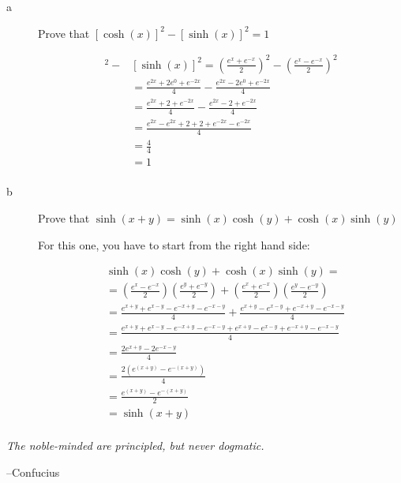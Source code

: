 \documentclass[fleqn,addpoints]{exam}
\begin{document}
\begin{description}
\item[a]
Prove that $[\cosh(x)]^2 - [\sinh(x)]^2 = 1$

\ifprintanswers
\begin{align*}
  [\cosh(x)]^2 - & [\sinh(x)]^2 = \left( \frac{e^x + e^{-x}}{2} \right)^2 - \left( \frac{e^x - e^{-x}}{2} \right)^2 \\
  &= \frac{e^{2x} + 2e^0 + e^{-2x}}{4} - \frac{e^{2x} - 2e^0 + e^{-2x}}{4} \\
  &= \frac{e^{2x} + 2 + e^{-2x}}{4} - \frac{e^{2x} - 2 + e^{-2x}}{4} \\
  &= \frac{e^{2x} - e^{2x} + 2 + 2 + e^{-2x} - e^{-2x}}{4} \\
  &= \frac{4}{4} \\
  &= 1 \\
\end{align*}
\fi

\item[b]
Prove that $\sinh(x+y) = \sinh(x)\cosh(y) + \cosh(x)\sinh(y)$

\ifprintanswers

For this one, you have to start from the right hand side:

\begin{align*}
  & \sinh(x)\cosh(y) + \cosh(x)\sinh(y) = \\
  &= \left( \frac{e^x - e^{-x}}{2} \right) \left( \frac{e^y + e^{-y}}{2} \right) 
      + \left( \frac{e^x + e^{-x}}{2} \right) \left( \frac{e^y - e^{-y}}{2} \right) \\
  &= \frac{e^{x+y} + e^{x-y} - e^{-x+y} - e^{-x-y}}{4} + \frac{e^{x+y} - e^{x-y} + e^{-x+y} - e^{-x-y}}{4} \\
  &= \frac{e^{x+y} + e^{x-y} - e^{-x+y} - e^{-x-y} + e^{x+y} - e^{x-y} + e^{-x+y} - e^{-x-y}}{4} \\
  &= \frac{2e^{x+y} - 2e^{-x-y}}{4} \\
  &= \frac{2(e^{(x+y)} - e^{-(x+y)})}{4} \\
  &= \frac{e^{(x+y)} - e^{-(x+y)}}{2} \\
  &= \sinh(x+y) \\
\end{align*}
\fi

\end{description}

\ifprintanswers
\else

\vspace{3 in}

{\em The noble-minded are principled, but never dogmatic.}

\vspace{.1 cm}
\hspace{1 cm} --Confucius
\fi
\end{document}
